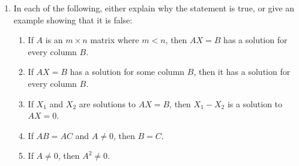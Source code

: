 \documentclass[letterpaper,12pt]{amsart}
\begin{document}
\begin{enumerate}
\bigskip

\item In each of the following, either explain why the statement is true, or give an example showing that it is false:
 \begin{enumerate}
 \item If $A$ is an $m\times n$ matrix where $m<n$, then $AX=B$ has a solution for every column $B$.
 \item If $AX=B$ has a solution for some column $B$, then it has a solution for every column $B$.
 \item If $X_1$ and $X_2$ are solutions to $AX=B$, then $X_1-X_2$ is a solution to $AX=0$.
 \item If $AB=AC$ and $A\neq 0$, then $B=C$.
 \item If $A\neq 0$, then $A^2\neq 0$.
 \end{enumerate}
\end{enumerate}
\end{document}

